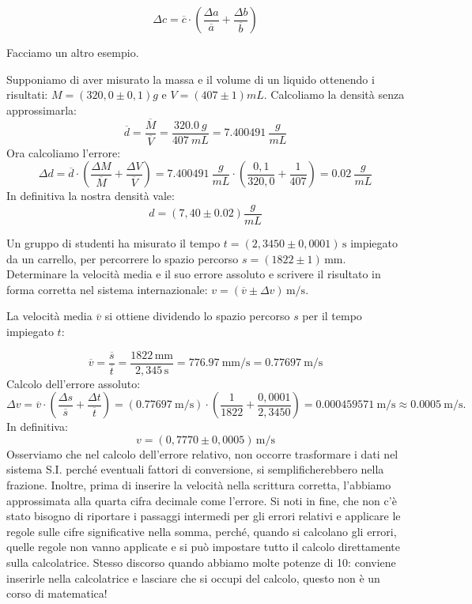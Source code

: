 \documentclass[12pt,a4paper,oneside]{book}
\newcounter{testexample} %
\theoremstyle{esercizio}
\begin{document}
\[
\Delta c = \overline{c} \cdot \left(\frac{\Delta a}{\overline{a}} + \frac{\Delta b}{\overline{b}}\right)
\] 


Facciamo un altro esempio.
\vspace{0.5 cm}
\begin{testexample}
Supponiamo di aver misurato la massa e il volume di un liquido ottenendo i risultati: $M=\left(320,0  \pm 0,1 \right)\si{g} $ e $V=\left(407 \pm 1 \right)\si{mL}$. Calcoliamo la densità senza approssimarla:
\[
\overline{d}=\frac{\overline{M}}{\overline{V}}=\frac{\SI{320,0}{g}}{\SI{407}{mL}}=\SI{7,400491}{\frac{g}{mL}}
\]
Ora calcoliamo l'errore:
\[
\Delta d = \overline{d}\cdot \left(\frac{\Delta M}{\overline{M}} +\frac{\Delta V}{\overline{V}}  \right)   = \SI{7,400491}{\frac{g}{mL}}\cdot\left(\frac{0,1}{320,0} +\frac{1}{407}  \right) =\SI{0,02}{\frac{g}{mL}}
\]
In definitiva la nostra densità vale:
\[
d=\left(7,40 \pm 0.02 \right)\si{\frac{g}{mL}}
\]
\end{testexample}


\begin{testexample}
Un gruppo di studenti ha misurato il tempo $t=\left(2,3450 \pm 0,0001\right)\,\si{\second}$ impiegato da un carrello, per percorrere  lo spazio percorso $s=\left(1822 \pm 1\right)\,\si{\milli\meter}$.  Determinare la velocità media e il suo errore assoluto e scrivere il risultato in forma corretta nel sistema internazionale: $v = \left( \overline{v} \pm \Delta v\right)\,\si{\meter\per\second}$.


La velocità media $\overline{v}$ si ottiene dividendo lo spazio percorso $s$ per il tempo impiegato $t$:

$$\overline{v} = \frac{\overline{s}}{\overline{t}} = \frac{1822\,\si{\milli\meter}}{2,345\,\si{\second}} = \SI{776,97}{\milli\meter\per\second} =  \SI{0,77697}{\meter\per\second}  $$
Calcolo dell'errore assoluto:
\[
\Delta v = \overline{v}\cdot \left(\frac{\Delta s}{\overline{s}} +\frac{\Delta t}{\overline{t}}  \right) =  \left( \SI{0,77697}{\meter\per\second}\right)\cdot \left(\frac{1}{1822} +\frac{0,0001}{2,3450}  \right) = \SI{0,000459571}{\meter\per\second} \approx \SI{0,0005}{\meter\per\second}.   
\]
In definitiva:
\[
v=\left(0,7770 \pm 0,0005\right) \, \si{\meter\per\second}
\]
Osserviamo che nel calcolo dell'errore relativo, non occorre trasformare i dati nel sistema S.I. perché eventuali fattori di conversione, si semplificherebbero nella frazione. Inoltre, prima di inserire la velocità nella scrittura corretta, l'abbiamo approssimata alla quarta cifra decimale come l'errore. Si noti in fine, che non c'è stato bisogno di riportare i passaggi intermedi per gli errori relativi e applicare le regole sulle cifre significative nella somma, perché, quando si calcolano gli errori, quelle regole non vanno applicate e si può impostare tutto il calcolo direttamente sulla calcolatrice. Stesso discorso quando abbiamo molte potenze di 10: conviene inserirle nella calcolatrice e lasciare che si occupi del calcolo, questo non è un corso di matematica!
 \end{testexample}
\end{document}
